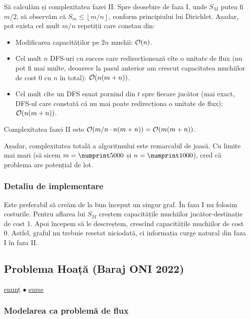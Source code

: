 \documentclass[../main.tex]{subfiles}
\begin{document}
Să calculăm și complexitatea fazei II. Spre deosebire de faza I, unde $S_M$ putea fi $m/2$, să observăm că $S_m \leq \left\lfloor m/n \right\rfloor$, conform principiului lui Dirichlet. Așadar, pot exista cel mult $m/n$ repetiții care constau din:

\begin{itemize}
  \item Modificarea capacităților pe $2n$ muchii: $\mathcal{O}(n)$.
  \item Cel mult $n$ DFS-uri cu succes care redirecționează cîte o unitate de flux (nu pot fi mai multe, deoarece la pasul anterior am crescut capacitatea muchiilor de cost 0 cu $n$ în total): $\mathcal{O}(n(m + n))$.
  \item Cel mult cîte un DFS eșuat pornind din $t$ spre fiecare jucător (mai exact, DFS-ul care constată că nu mai poate redirecționa o unitate de flux): $\mathcal{O}(n(m + n))$.
\end{itemize}

Complexitatea fazei II este $\mathcal{O}(m/n \cdot n(m + n)) = \mathcal{O}(m(m + n))$.

Așadar, complexitatea totală a algoritmului este remarcabil de joasă. Cu limite mai mari (să sicem $m = \np{5000}$ și $n = \np{1000}$), cred că problema are potențial de lot.

\subsubsection*{Detaliu de implementare}

Este preferabil să creăm de la bun început un singur graf. În faza I nu folosim costurile. Pentru aflarea lui $S_M$ creștem capacitățile muchiilor jucător-destinație de cost 1. Apoi începem să le descreștem, crescînd capacitățile muchiilor de cost 0. Astfel, graful nu trebuie resetat niciodată, ci informația curge natural din faza I în faza II.


\subsection{Problema Hoață (Baraj ONI 2022)}
\label{problem:hoata}

\href{https://kilonova.ro/problems/146}{enunț}
$\bullet$
\hyperref[code:hoata]{surse}

\subsubsection*{Modelarea ca problemă de flux}
\end{document}
